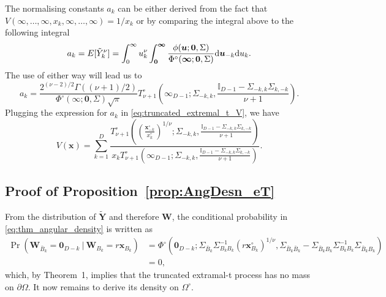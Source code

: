 \documentclass[12pt]{article}
\begin{document}
The normalising constants $a_k$ can be either derived from the fact that $V(\infty,\dots,\infty,x_k,\infty,\dots,\infty) = 1/x_k$ or by comparing the integral above to the following integral 
\begin{equation*}
\label{eq:normalising_trunc}
a_k = E[\tilde Y_k^\nu] = \int_0^\infty u_k^\nu \int_{\bm 0}^{\bm \infty} \frac{\phi(\bm u; \bm 0,\Sigma)}{\Phi^\circ(\bm \infty;\bm 0, \Sigma)}\text d \bm u_{-k}\text d u_k.	
\end{equation*}
The use of either way will lead us to 
\begin{equation*}
\label{eq:truncate_extremal_t_a}
a_k =\frac{2^{(\nu-2)/2}\Gamma((\nu+1)/2)}{\Phi^\circ(\bm \infty;\bm 0, \Sigma)\sqrt{\pi}} T_{\nu+1}^\circ\left(
\bm \infty_{D-1}
;\Sigma_{-k,k},\frac{\mathbb{I}_{D-1}-\Sigma_{-k,k}\Sigma_{k,-k}}{\nu+1}\right).
\end{equation*}
Plugging the expression for $a_k$ in \eqref{eq:truncated_extremal_t_V}, we have 
\begin{equation*}
V(\bm x) = \sum_{k=1}^D \frac{T_{\nu+1}^\circ\left( \left(\frac{\bm x_{-k}^\circ}{x_k^\circ}\right)^{1/\nu} ;\Sigma_{-k,k},\frac{\mathbb{I}_{D-1}-\Sigma_{-k,k}\Sigma_{k,-k}}{\nu+1}\right)}{x_k T_{\nu+1}^\circ\left(\bm \infty_{D-1};\Sigma_{-k,k},\frac{\mathbb{I}_{D-1}-\Sigma_{-k,k}\Sigma_{k,-k}}{\nu+1}\right)}.	
\end{equation*}

\subsection{Proof of Proposition~\ref{prop:AngDesn_eT}}

From the distribution of $\tilde{\bm Y}$ and therefore $\bm W$, the conditional probability in \eqref{eq:thm_angular_density} is written as
%
\begin{align*}
\Pr(\bm W_{\bar{B}_k} = \bm 0_{D-k} \ | \ \bm W_{B_k} = r \bm x_{B_k} )
& = \Phi^\circ \left( \bm 0_{D-k};
\Sigma_{\bar{B}_k}\Sigma_{B_k B_k}^{-1} \left(r \bm x_{B_k}^\circ\right)^{1/\nu},\Sigma_{\bar{B}_k\bar{B}_k}-\Sigma_{\bar{B}_k B_k}\Sigma_{B_k B_k}^{-1}\Sigma_{\bar{B}_k B_k} \right) \\
& = 0,
\end{align*}
%
which, by Theorem~1, implies that the truncated extramal-t process has no mass on $\partial\Omega$. It now remains to derive its density on $\Omega^\circ$. 
\end{document}

